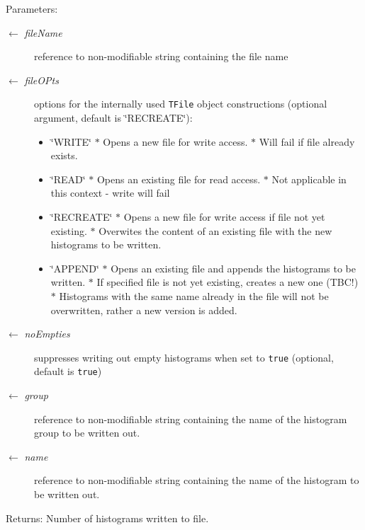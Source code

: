 \begin{Desc}
\item[Parameters:]
\begin{description}
\item[\mbox{$\leftarrow$} {\em file\-Name}]reference to non-modifiable string containing the file name \item[\mbox{$\leftarrow$} {\em file\-OPts}]options for the internally used {\tt TFile} object constructions (optional argument, default is \char`\"{}RECREATE\char`\"{}):\begin{itemize}
\item \char`\"{}WRITE\char`\"{} $\ast$ Opens a new file for write access. $\ast$ Will fail if file already exists.\item \char`\"{}READ\char`\"{} $\ast$ Opens an existing file for read access. $\ast$ Not applicable in this context - write will fail\item \char`\"{}RECREATE\char`\"{} $\ast$ Opens a new file for write access if file not yet existing. $\ast$ Overwites the content of an existing file with the new histograms to be written.\item \char`\"{}APPEND\char`\"{} $\ast$ Opens an existing file and appends the histograms to be written. $\ast$ If specified file is not yet existing, creates a new one (TBC!) $\ast$ Histograms with the same name already in the file will not be overwritten, rather a new version is added. \end{itemize}
\item[\mbox{$\leftarrow$} {\em no\-Empties}]suppresses writing out empty histograms when set to {\tt true} (optional, default is {\tt true}) \item[\mbox{$\leftarrow$} {\em group}]reference to non-modifiable string containing the name of the histogram group to be written out. \item[\mbox{$\leftarrow$} {\em name}]reference to non-modifiable string containing the name of the histogram to be written out.\end{description}
\end{Desc}
\begin{Desc}
\item[Returns:]Number of histograms written to file. \end{Desc}
